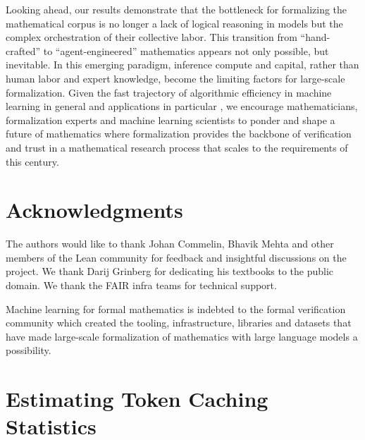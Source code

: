 \documentclass[]{fairmeta}
\begin{document}
Looking ahead, our results demonstrate that the bottleneck for formalizing the mathematical corpus is no longer a lack of logical reasoning in models but the complex orchestration of their collective labor. This transition from ``hand-crafted'' to ``agent-engineered'' mathematics appears not only possible, but inevitable. In this emerging paradigm, inference compute and capital, rather than human labor and expert knowledge, become the limiting factors for large-scale formalization.
Given the fast trajectory of algorithmic efficiency in machine learning in general \citep{erdil2023algorithmicprogresscomputervision,gundlach2025priceprogressalgorithmicefficiency,modded_nanogpt_2024,epoch2025llminferencepricetrends} and applications in particular \citep[e.g.][]{wu2019accelerating,lin2023evolutionary}, we encourage mathematicians, formalization experts and machine learning scientists to ponder and shape a future of mathematics where formalization provides the backbone of verification and trust in a mathematical research process that scales to the requirements of this century.

\section*{Acknowledgments}
The authors would like to thank Johan Commelin, Bhavik Mehta and other members of the Lean community for feedback and insightful discussions on the project. We thank Darij Grinberg for dedicating his textbooks to the public domain. We thank the FAIR infra teams for technical support.

Machine learning for formal mathematics is indebted to the formal verification community which created the tooling, infrastructure, libraries and datasets that have made large-scale formalization of mathematics with large language models a possibility.

\clearpage
\newpage



\clearpage
\newpage
\beginappendix

\section{Estimating Token Caching Statistics}
\label{app:cache}
\end{document}
